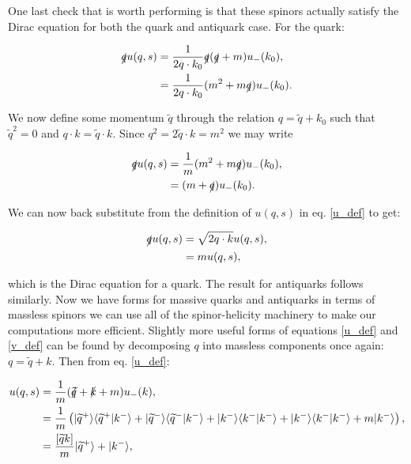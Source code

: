 		One last check that is worth performing is that these spinors actually satisfy the Dirac
		equation for both the quark and antiquark case.  For the quark:

		\begin{subequations}
		\begin{align*}
			\slashed q u(q, s) &= \frac{1}{2q\cdot k_0}\slashed q(\slashed q + m)u_-(k_0), \\
			                   &= \frac{1}{2q\cdot k_0}(m^2 + m\slashed q)u_-(k_0). \\
		\end{align*}
		\end{subequations}

		We now define some momentum $\widetilde{q}$ through the relation $q = \widetilde{q} + k_0$ such that $\widetilde{q}^2=0$ and
		$q\cdot k = \widetilde{q}\cdot k$.  Since $q^2=2\widetilde{q}\cdot k=m^2$ we may write

		\begin{subequations}
		\begin{align*}
			\slashed q u(q, s) &= \frac{1}{m}(m^2 + m\slashed q)u_-(k_0), \\
			                   &= (m + \slashed q)u_-(k_0). \\
		\end{align*}
		\end{subequations}

		We can now back substitute from the definition of $u(q, s)$ in eq. \eqref{u_def} to get:

		\begin{subequations}
		\begin{align*}
			\slashed q u(q, s) &= \sqrt{2q\cdot k}u(q, s), \\
			                   &= mu(q,s), \\
		\end{align*}
		\end{subequations}

		which is the Dirac equation for a quark.  The result for antiquarks follows similarly.
		Now we have forms for massive quarks and antiquarks in terms of massless spinors we can
		use all of the spinor-helicity machinery to make our computations more efficient.  Slightly
		more useful forms of equations \eqref{u_def} and \eqref{v_def} can be found by decomposing $q$
		into massless components once again: $q=\widetilde{q}+k$.  Then from eq. \eqref{u_def}:

		\begin{subequations}
		\begin{align*}
			u(q, s) &= \frac{1}{m}(\slashed{\widetilde{q}} + \slashed{k} + m)u_-(k), \\
			        &= \frac{1}{m}\left(|\widetilde{q}^+ \rangle\langle \widetilde{q}^+|k^-\rangle +
			        |\widetilde{q}^- \rangle\langle \widetilde{q}^-|k^-\rangle + |k^- \rangle\langle k^-|k^-\rangle +
			        |k^- \rangle\langle k^-|k^-\rangle + m|k^-\rangle\right), \\
			        &= \frac{[\widetilde{q}k]}{m}|\widetilde{q}^+\rangle + |k^-\rangle,
		\end{align*}
		\end{subequations}

